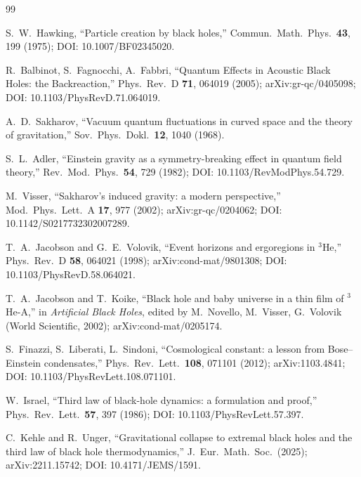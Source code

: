 \documentclass[aps,prl,reprint,nofootinbib,superscriptaddress]{revtex4-2}
\begin{document}
\begin{thebibliography}{99}

S.~W.~Hawking, ``Particle creation by black holes,''
Commun.\ Math.\ Phys.\ \textbf{43}, 199 (1975);
DOI: 10.1007/BF02345020.

R.~Balbinot, S.~Fagnocchi, A.~Fabbri,
``Quantum Effects in Acoustic Black Holes: the Backreaction,''
Phys.\ Rev.\ D \textbf{71}, 064019 (2005);
arXiv:gr-qc/0405098;
DOI: 10.1103/PhysRevD.71.064019.

A.~D.~Sakharov, ``Vacuum quantum fluctuations in curved space and the
theory of gravitation,'' Sov.\ Phys.\ Dokl.\ \textbf{12}, 1040 (1968).

S.~L.~Adler, ``Einstein gravity as a symmetry-breaking effect in quantum
field theory,'' Rev.\ Mod.\ Phys.\ \textbf{54}, 729 (1982);
DOI: 10.1103/RevModPhys.54.729.

M.~Visser, ``Sakharov's induced gravity: a modern perspective,''
Mod.\ Phys.\ Lett.\ A \textbf{17}, 977 (2002);
arXiv:gr-qc/0204062;
DOI: 10.1142/S0217732302007289.

T.~A.~Jacobson and G.~E.~Volovik, ``Event horizons and ergoregions
in $^{3}$He,'' Phys.\ Rev.\ D \textbf{58}, 064021 (1998);
arXiv:cond-mat/9801308;
DOI: 10.1103/PhysRevD.58.064021.

T.~A.~Jacobson and T.~Koike, ``Black hole and baby universe in a
thin film of $^{3}$He-A,'' in \emph{Artificial Black Holes}, edited
by M.~Novello, M.~Visser, G.~Volovik (World Scientific, 2002);
arXiv:cond-mat/0205174.

S.~Finazzi, S.~Liberati, L.~Sindoni, ``Cosmological constant: a lesson
from Bose--Einstein condensates,'' Phys.\ Rev.\ Lett.\ \textbf{108},
071101 (2012); arXiv:1103.4841;
DOI: 10.1103/PhysRevLett.108.071101.

W.~Israel,
``Third law of black-hole dynamics: a formulation and proof,''
Phys.\ Rev.\ Lett.\ \textbf{57}, 397 (1986);
DOI: 10.1103/PhysRevLett.57.397.

C.~Kehle and R.~Unger, ``Gravitational collapse to extremal black
holes and the third law of black hole thermodynamics,''
J.~Eur.~Math.~Soc.\ (2025); arXiv:2211.15742;
DOI: 10.4171/JEMS/1591.


\end{thebibliography}
\end{document}
